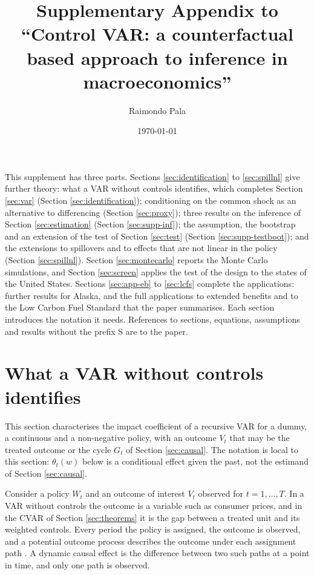 \documentclass[12pt,a4paper]{article}
\title{Supplementary Appendix to\\ ``Control VAR: a counterfactual based approach to inference in macroeconomics''}
\author{Raimondo Pala}
\date{\today}
\theoremstyle{definition}
\begin{document}
\maketitle

This supplement has three parts. Sections \ref{sec:identification} to \ref{sec:spillnl} give further theory: what a VAR without controls identifies, which completes Section \ref{sec:var} (Section \ref{sec:identification}); conditioning on the common shock as an alternative to differencing (Section \ref{sec:proxy}); three results on the inference of Section \ref{sec:estimation} (Section \ref{sec:supp-inf}); the assumption, the bootstrap and an extension of the test of Section \ref{sec:test} (Section \ref{sec:supp-testboot}); and the extensions to spillovers and to effects that are not linear in the policy (Section \ref{sec:spillnl}). Section \ref{sec:montecarlo} reports the Monte Carlo simulations, and Section \ref{sec:screen} applies the test of the design to the states of the United States. Sections \ref{sec:app-eb} to \ref{sec:lcfs} complete the applications: further results for Alaska, and the full applications to extended benefits and to the Low Carbon Fuel Standard that the paper summarises. Each section introduces the notation it needs. References to sections, equations, assumptions and results without the prefix S are to the paper.

\section{What a VAR without controls identifies\label{sec:identification}}

This section characterises the impact coefficient of a recursive VAR for a dummy, a continuous and a non-negative policy, with an outcome $V_t$ that may be the treated outcome or the cycle $G_t$ of Section \ref{sec:causal}. The notation is local to this section: $\theta_t(w)$ below is a conditional effect given the past, not the estimand of Section \ref{sec:causal}.

Consider a policy $W_t$ and an outcome of interest $V_t$ observed for $t=1,\dots,T$. In a VAR without controls the outcome is a variable such as consumer prices, and in the CVAR of Section \ref{sec:theorems} it is the gap between a treated unit and its weighted controls. Every period the policy is assigned, the outcome is observed, and a potential outcome process describes the outcome under each assignment path \citep{RambachanSheppard2021}. A dynamic causal effect is the difference between two such paths at a point in time, and only one path is observed.
\end{document}

